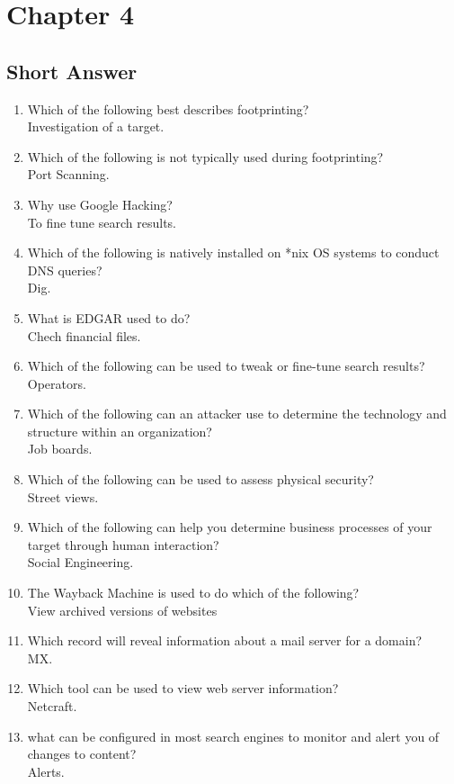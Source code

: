 \section{Chapter 4}
\subsection{Short Answer}
\begin{enumerate}
    \item Which of the following best describes footprinting?\\Investigation of a target.
    \item Which of the following is not typically used during footprinting?\\Port Scanning.
    \item Why use Google Hacking?\\To fine tune search results.
    \item Which of the following is natively installed on *nix OS systems to conduct DNS queries?\\Dig.
    \item What is EDGAR used to do?\\Chech financial files.
    \item Which of the following can be used to tweak or fine-tune search results?\\Operators.
    \item Which of the following can an attacker use to determine the technology and structure within an organization?\\Job boards.
    \item Which of the following can be used to assess physical security?\\Street views.
    \item Which of the following can help you determine business processes of your target through human interaction?\\Social Engineering.
    \item The Wayback Machine is used to do which of the following?\\View archived versions of websites
    \item Which record will reveal information about a mail server for a domain?\\MX.
    \item Which tool can be used to view web server information?\\Netcraft.
    \item what can be configured in most search engines to monitor and alert you of changes to content?\\Alerts.

\end{enumerate}
